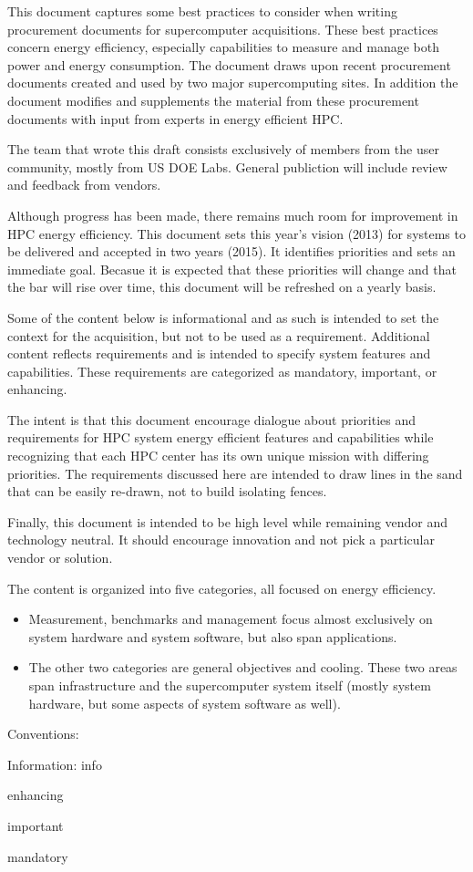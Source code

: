 This document captures some best practices to consider when writing procurement documents for supercomputer acquisitions. These best practices concern energy efficiency, especially capabilities to measure and manage both power and energy consumption. The document draws upon recent procurement documents created and used by two major supercomputing sites. In addition the document modifies and supplements the material from these procurement documents with input from experts in energy efficient HPC.
 
The team that wrote this draft consists exclusively of members from the user community, mostly from US DOE Labs.  General publiction will include review and feedback from vendors.

Although  progress has been made, there remains much room for improvement in HPC energy efficiency. This document sets this year’s vision (2013) for systems to be delivered and accepted in two years (2015). It identifies priorities and sets an immediate goal.  Becasue it is expected that these priorities will change and that the bar will rise over time, this document will be refreshed on a yearly basis.

Some of the content below is informational and as such is intended to set the context for the acquisition, but not to be used as a requirement.  Additional content reflects requirements and is intended to specify system features and capabilities.  These requirements are categorized as mandatory, important, or enhancing.

The intent is that this document encourage dialogue about priorities and requirements for HPC system energy efficient features and capabilities while recognizing that each HPC center has its own unique mission with differing priorities. The requirements discussed here are intended to draw lines in the sand that can be easily re-drawn, not to build isolating fences.
 
Finally, this document is intended to be high level while remaining vendor and technology neutral.  It should encourage innovation and not pick a particular vendor or solution.

The content is organized into five categories, all focused on energy efficiency.  

\begin{itemize}
\item
Measurement, benchmarks and management focus almost exclusively on system hardware and system software, but also span applications.  
\item
The other two categories are general objectives and cooling.  These two areas span infrastructure and the supercomputer system itself (mostly system hardware, but some aspects of system software as well).
\end{itemize}

Conventions:

Information: info

\begin{packed_enum}
\item
enhancing
\item
important
\item
mandatory
\end{packed_enum}
